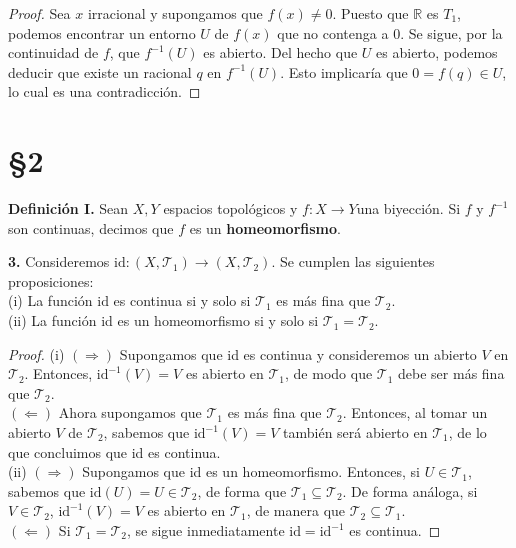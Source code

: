 \documentclass{article}
\begin{document}
\begin{proof}
	Sea $x$ irracional y supongamos que $f(x) \neq 0$. Puesto que $\mathbb{R}$ es $T_{1}$, podemos encontrar un entorno $U$ de $f(x)$ que no contenga a $0$. Se sigue, por la continuidad de $f$, que $f^{-1}(U)$ es abierto. Del hecho que $U$ es abierto, podemos deducir que existe un racional $q$ en $f^{-1}(U)$. Esto implicaría que $0 = f(q) \in U$, lo cual es una contradicción. 
\end{proof}

\section*{§2 }

\textbf{Definición I. } Sean $X, Y$ espacios topológicos y $f: X \rightarrow Y$una biyección. Si $f$ y $f^{-1}$ son continuas, decimos que $f$ es un \textbf{homeomorfismo}. \\

\begin{mybox}
	\textbf{3. } Consideremos $\text{id}: (X, \mathcal{T}_{1}) \rightarrow (X, \mathcal{T}_{2})$. Se cumplen las siguientes proposiciones: \\
	
	(i) La función $\text{id}$ es continua si y solo si $\mathcal{T}_{1}$ es más fina que $\mathcal{T}_{2}$. \\
	
	(ii) La función id es un homeomorfismo si y solo si $\mathcal{T}_{1} = \mathcal{T}_{2}$.  
\end{mybox}	
\begin{proof}
	(i) $(\Rightarrow)$ Supongamos que id es continua y consideremos un abierto $V$ en $\mathcal{T}_{2}$. Entonces, $\text{id}^{-1}(V) = V$ es abierto en $\mathcal{T}_{1}$, de modo que $\mathcal{T}_{1}$ debe ser más fina que $\mathcal{T}_{2}$. \\
	$(\Leftarrow)$ Ahora supongamos que $\mathcal{T}_{1}$ es más fina que $\mathcal{T}_{2}$. Entonces, al tomar un abierto $V$ de $\mathcal{T}_{2}$, sabemos que $\text{id}^{-1}(V) = V$ también será abierto en $\mathcal{T}_{1}$, de lo que concluimos que id es continua. \\
	
	(ii) $(\Rightarrow)$ Supongamos que id es un homeomorfismo. Entonces, si $U \in \mathcal{T}_{1}$, sabemos que $\text{id}(U) = U \in \mathcal{T}_{2}$, de forma que $\mathcal{T}_{1} \subseteq \mathcal{T}_{2}$.   De forma análoga, si $V \in \mathcal{T}_{2}$, $\text{id}^{-1}(V) = V$ es abierto en $\mathcal{T}_{1}$, de manera que $\mathcal{T}_{2} \subseteq \mathcal{T}_{1}$. \\
	$(\Leftarrow)$ Si $\mathcal{T}_{1} = \mathcal{T}_{2}$, se sigue inmediatamente $\text{id} = \text{id}^{-1}$ es continua.  
\end{proof}
\end{document}
